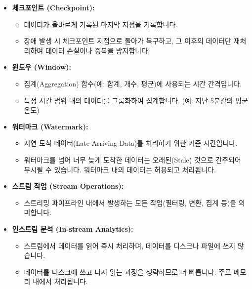 \documentclass[11pt,a4paper]{article}
\begin{document}
\begin{itemize}
\begin{itemize}
        \item \textbf{Append (추가):} 새로운 데이터만 추가합니다.
        \item \textbf{Overwrite (덮어쓰기):} 기존 데이터를 모두 삭제하고 새로운 데이터로 덮어씁니다.
        \item \textbf{Update (업데이트):} 기존 데이터를 업데이트하거나 새로운 데이터를 추가합니다.
    \end{itemize}
    \item \textbf{체크포인트 (Checkpoint):}
    \begin{itemize}
        \item 데이터가 올바르게 기록된 마지막 지점을 기록합니다.
        \item 장애 발생 시 체크포인트 지점으로 돌아가 복구하고, 그 이후의 데이터만 재처리하여 데이터 손실이나 중복을 방지합니다.
    \end{itemize}
    \item \textbf{윈도우 (Window):}
    \begin{itemize}
        \item 집계(Aggregation) 함수(예: 합계, 개수, 평균)에 사용되는 시간 간격입니다.
        \item 특정 시간 범위 내의 데이터를 그룹화하여 집계합니다. (예: 지난 5분간의 평균 온도)
    \end{itemize}
    \item \textbf{워터마크 (Watermark):}
    \begin{itemize}
        \item 지연 도착 데이터(Late Arriving Data)를 처리하기 위한 기준 시간입니다.
        \item 워터마크를 넘어 너무 늦게 도착한 데이터는 오래된(Stale) 것으로 간주되어 무시될 수 있습니다. 워터마크 내의 데이터는 허용되고 처리됩니다.
    \end{itemize}
    \item \textbf{스트림 작업 (Stream Operations):}
    \begin{itemize}
        \item 스트리밍 파이프라인 내에서 발생하는 모든 작업(필터링, 변환, 집계 등)을 의미합니다.
    \end{itemize}
    \item \textbf{인스트림 분석 (In-stream Analytics):}
    \begin{itemize}
        \item 스트림에서 데이터를 읽어 즉시 처리하며, 데이터를 디스크나 파일에 쓰지 않습니다.
        \item 데이터를 디스크에 쓰고 다시 읽는 과정을 생략하므로 더 빠릅니다. 주로 메모리 내에서 처리됩니다.
    \end{itemize}
\end{itemize}
\end{document}
